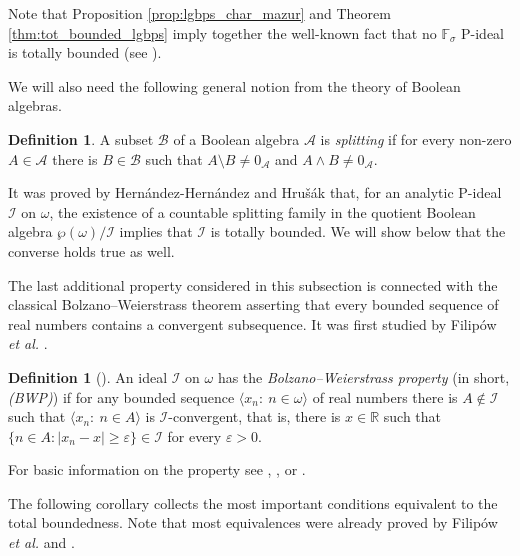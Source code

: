 \documentclass[a4paper,11pt,fleqn]{amsart}
\newtheorem{corollary}[theorem]{Corollary}
\theoremstyle{definition}
\newtheorem{definition}[theorem]{Definition}
\theoremstyle{remark}
\numberwithin{equation}{section}
\newcommand{\eps}{\varepsilon}
\newcommand{\N}{\mathbb{N}}
\newcommand{\R}{\mathbb{R}}
\newcommand{\F}{\mathbb{F}}
\newcommand{\aA}{\mathcal{A}}
\newcommand{\bB}{\mathcal{B}}
\newcommand{\iI}{\mathcal{I}}
\newcommand{\sm}{\setminus}
\newcommand{\seq}[2]{\big\langle#1\colon\ #2\big\rangle}
\newcommand{\seqn}[1]{\big\langle#1\colon\ n\io\big\rangle}
\newcommand{\io}{\in\omega}%
\newcommand{\wo}{{\wp(\omega)}}%
\begin{document}
Note that Proposition \ref{prop:lgbps_char_mazur} and Theorem \ref{thm:tot_bounded_lgbps} imply together the well-known fact that no $\F_\sigma$ P-ideal is totally bounded (see \cite[page 590]{HHH07}).

We will also need the following general notion from the theory of Boolean algebras.

\begin{definition}\label{def:splitting}
A subset $\bB$ of a Boolean algebra $\aA$ is \textit{splitting} if for every non-zero $A\in\aA$ there is $B\in\bB$ such that $A\sm B\neq0_\aA$ and $A\wedge B\neq0_\aA$.
\end{definition}

It was proved by Hern\'{a}ndez-Hern\'{a}ndez and Hru\v{s}\'{a}k \cite[Lemma 3.17]{HHH07} that, for an analytic P-ideal $\iI$ on $\omega$, the existence of a countable splitting family in the quotient Boolean algebra $\wo/\iI$ implies that $\iI$ is totally bounded. We will show below that the converse holds true as well.


The last additional property considered in this subsection is connected with the classical Bolzano--Weierstrass theorem asserting that every bounded sequence of real numbers contains a convergent subsequence. It was first studied by Filip\'{o}w \textit{et al.} \cite[Section 2]{FMRS07}.

\begin{definition}[\cite{FMRS07}]\label{def:bwp}
An ideal $\iI$ on $\omega$ has the \textit{Bolzano--Weierstrass property} (in short, \textit{(BWP)}) if for any bounded sequence $\seqn{x_n}$ of real numbers there is $A\not\in\iI$ such that $\seq{x_n}{n\in A}$ is $\iI$-convergent, that is, there is $x\in\R$ such that $\big\{n\in A\colon \big|x_n-x\big|\ge\eps\big\}\in\iI$ for every $\eps>0$.
\end{definition}

For basic information on the property see \cite{BFMS11}, \cite{FMRS07}, or \cite{FS10}.

The following corollary collects the most important conditions equivalent to the total boundedness. Note that most equivalences were already proved by Filip\'{o}w \textit{et al.} \cite{BFMS13} and \cite{FMRS07}. %
\end{document}
